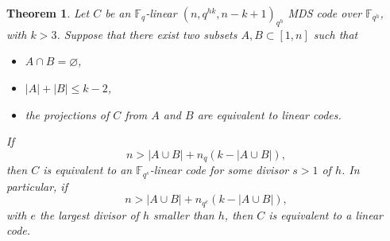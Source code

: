 \documentclass[a4paper]{article}
\newtheorem{thm}{Theorem}[section]
\theoremstyle{definition}
\newcommand{\FF}{\mathbb F}
\begin{document}
\begin{thm}
 \label{ThmMainKLarge}
 Let $C$ be an $\FF_q$-linear $(n,q^{hk},n-k+1)_{q^h}$ MDS code over $\FF_{q^h}$, with $k > 3$.
 Suppose that there exist two subsets $A, B \subset [1,n]$ such that
 \begin{itemize}
  \item $A \cap B = \varnothing$,
  \item $|A| + |B| \leq k-2$,
  \item the projections of $C$ from $A$ and $B$ are equivalent to linear codes.
 \end{itemize}
 If 
 \begin{equation}
  \label{EqMinQ}
  n > |A \cup B| + n_q(k-|A \cup B|), 
 \end{equation}
 then $C$ is equivalent to an $\FF_{q^s}$-linear code for some divisor $s > 1$ of $h$.
 In particular, if 
 \begin{equation}
  \label{EqMinQE}
  n > |A \cup B| + n_{q^e}(k-|A \cup B|), 
 \end{equation}
 with $e$ the largest divisor of $h$ smaller than $h$, then $C$ is equivalent to a linear code.
\end{thm}
\end{document}
